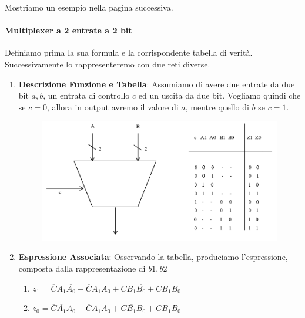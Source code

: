 \documentclass{article}
\begin{document}
Mostriamo un esempio nella pagina successiva.

\newpage

\paragraph{Multiplexer a 2 entrate a 2 bit} Definiamo prima la sua formula e la corrispondente tabella di verità. Successivamente lo rappresenteremo con due reti diverse.

\begin{enumerate}
    \item \textbf{Descrizione Funzione e Tabella}: Assumiamo di avere due entrate da due bit $a,b$, un entrata di controllo $c$ ed un uscita da due bit. Vogliamo quindi che se $c = 0$, allora in output avremo il valore di $a$, mentre quello di $b$ se $ c = 1 $.
    \begin{figure}[htbp]
        \center
        \includegraphics[scale=0.4]{img/multiplexerInput2.png}
    \end{figure}

    \item \textbf{Espressione Associata}: Osservando la tabella, produciamo l'espressione, composta dalla rappresentazione di $b1,b2$

    \begin{enumerate}
        \item $z_{1} = \overline{C}A_{1}\overline{A_{0}} + \overline{C}A_{1}A_{0} + CB_{1}\overline{B_{0}} + CB_{1}B_{0}$
        \item $z_{0} = \overline{C}\overline{A_{1}}A_{0} + \overline{C}A_{1}A_{0} + C\overline{B_{1}}B_{0} + CB_{1}B_{0}$
    \end{enumerate}


\end{enumerate}
\end{document}
